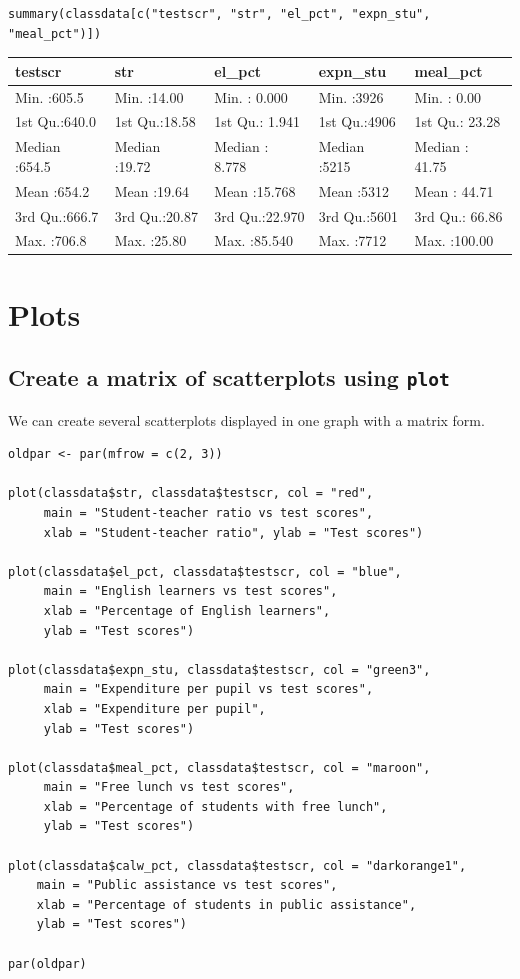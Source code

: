 \documentclass[11pt]{article}
\begin{document}
\begin{verbatim}
summary(classdata[c("testscr", "str", "el_pct", "expn_stu", "meal_pct")])
\end{verbatim}

\begin{center}
\begin{tabular}{lllll}
testscr & str & el\_pct & expn\_stu & meal\_pct\\
\hline
Min.   :605.5 & Min.   :14.00 & Min.   : 0.000 & Min.   :3926 & Min.   :  0.00\\
1st Qu.:640.0 & 1st Qu.:18.58 & 1st Qu.: 1.941 & 1st Qu.:4906 & 1st Qu.: 23.28\\
Median :654.5 & Median :19.72 & Median : 8.778 & Median :5215 & Median : 41.75\\
Mean   :654.2 & Mean   :19.64 & Mean   :15.768 & Mean   :5312 & Mean   : 44.71\\
3rd Qu.:666.7 & 3rd Qu.:20.87 & 3rd Qu.:22.970 & 3rd Qu.:5601 & 3rd Qu.: 66.86\\
Max.   :706.8 & Max.   :25.80 & Max.   :85.540 & Max.   :7712 & Max.   :100.00\\
\end{tabular}
\end{center}


\section{Plots}
\label{sec:org7e15510}
\subsection*{Create a matrix of scatterplots using \texttt{plot}}
\label{sec:orgc7aca8d}
We can create several scatterplots displayed in one graph with a
matrix form.

\begin{verbatim}
oldpar <- par(mfrow = c(2, 3))

plot(classdata$str, classdata$testscr, col = "red",
     main = "Student-teacher ratio vs test scores",
     xlab = "Student-teacher ratio", ylab = "Test scores")

plot(classdata$el_pct, classdata$testscr, col = "blue",
     main = "English learners vs test scores",
     xlab = "Percentage of English learners",
     ylab = "Test scores")

plot(classdata$expn_stu, classdata$testscr, col = "green3",
     main = "Expenditure per pupil vs test scores",
     xlab = "Expenditure per pupil",
     ylab = "Test scores")

plot(classdata$meal_pct, classdata$testscr, col = "maroon",
     main = "Free lunch vs test scores",
     xlab = "Percentage of students with free lunch",
     ylab = "Test scores")

plot(classdata$calw_pct, classdata$testscr, col = "darkorange1",
    main = "Public assistance vs test scores",
    xlab = "Percentage of students in public assistance",
    ylab = "Test scores")

par(oldpar)
\end{verbatim}
\end{document}
